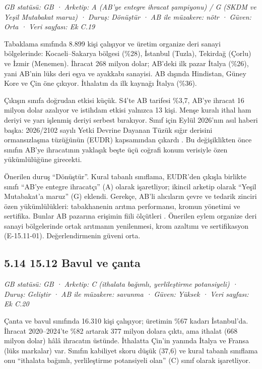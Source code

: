 \emph{GB statüsü: GB · Arketip: A (AB'ye entegre ihracat şampiyonu) / G (SKDM ve Yeşil Mutabakat maruz) · Duruş: Dönüştür · AB ile müzakere: nötr · Güven: Orta · Veri sayfası: Ek C.19}

Tabaklama sınıfında 8.899 kişi çalışıyor ve üretim organize deri sanayi bölgelerinde: Kocaeli--Sakarya bölgesi (\%28), İstanbul (Tuzla), Tekirdağ (Çorlu) ve İzmir (Menemen). İhracat 268 milyon dolar; AB'deki ilk pazar İtalya (\%26), yani AB'nin lüks deri eşya ve ayakkabı sanayisi. AB dışında Hindistan, Güney Kore ve Çin öne çıkıyor. İthalatın da ilk kaynağı İtalya (\%36).

Çıkışın sınıfa doğrudan etkisi küçük. S4'te AB tarifesi \%3,7, AB'ye ihracat 16 milyon dolar azalıyor ve istihdam etkisi yalnızca 13 kişi. Menşe kuralı ithal ham deriyi ve yarı işlenmiş deriyi serbest bırakıyor. Sınıf için Eylül 2026'nın asıl haberi başka: 2026/2102 sayılı Yetki Devrine Dayanan Tüzük sığır derisini ormansızlaşma tüzüğünün (EUDR) kapsamından çıkardı \etiketV{}. Bu değişiklikten önce sınıfın AB'ye ihracatının yaklaşık beşte üçü coğrafi konum verisiyle özen yükümlülüğüne girecekti.

Önerilen duruş ``Dönüştür''. Kural tabanlı sınıflama, EUDR'den çıkışla birlikte sınıfı ``AB'ye entegre ihracatçı'' (A) olarak işaretliyor; ikincil arketip olarak ``Yeşil Mutabakat'a maruz'' (G) eklendi. Gerekçe, AB'li alıcıların çevre ve tedarik zinciri özen yükümlülükleri: tabakhanenin arıtma performansı, kromun yönetimi ve sertifika. Bunlar AB pazarına erişimin fiili ölçütleri \etiketH{}. Önerilen eylem organize deri sanayi bölgelerinde ortak arıtmanın yenilenmesi, krom azaltımı ve sertifikasyon (E-15.11-01). Değerlendirmenin güveni orta.

\hypertarget{nace_kartlar_13-15-514-1512-bavul-ve-uxe7anta}{%
\subsection{5.14 15.12 Bavul ve çanta}\label{nace_kartlar_13-15-514-1512-bavul-ve-uxe7anta}}

\emph{GB statüsü: GB · Arketip: C (ithalata bağımlı, yerlileştirme potansiyeli) · Duruş: Geliştir · AB ile müzakere: savunma · Güven: Yüksek · Veri sayfası: Ek C.20}

Çanta ve bavul sınıfında 16.310 kişi çalışıyor; üretimin \%67 kadarı İstanbul'da. İhracat 2020--2024'te \%82 artarak 377 milyon dolara çıktı, ama ithalat (668 milyon dolar) hâlâ ihracatın üstünde. İthalatta Çin'in yanında İtalya ve Fransa (lüks markalar) var. Sınıfın kabiliyet skoru düşük (37,6) ve kural tabanlı sınıflama onu ``ithalata bağımlı, yerlileştirme potansiyeli olan'' (C) sınıf olarak işaretliyor.

